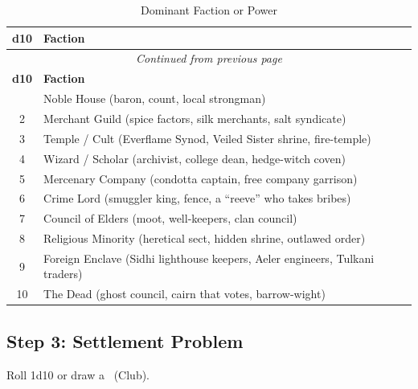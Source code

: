 \begin{center}
\begin{longtable}{cl}
\caption{Dominant Faction or Power}\\
\toprule
\textbf{d10} & \textbf{Faction} \\
\midrule
\endfirsthead
\multicolumn{2}{c}{\emph{Continued from previous page}} \\
\toprule
\textbf{d10} & \textbf{Faction} \\
\midrule
\endhead
\bottomrule
\endfoot
1 & Noble House (baron, count, local strongman) \\
2 & Merchant Guild (spice factors, silk merchants, salt syndicate) \\
3 & Temple / Cult (Everflame Synod, Veiled Sister shrine, fire-temple) \\
4 & Wizard / Scholar (archivist, college dean, hedge-witch coven) \\
5 & Mercenary Company (condotta captain, free company garrison) \\
6 & Crime Lord (smuggler king, fence, a ``reeve'' who takes bribes) \\
7 & Council of Elders (moot, well-keepers, clan council) \\
8 & Religious Minority (heretical sect, hidden shrine, outlawed order) \\
9 & Foreign Enclave (Sidhi lighthouse keepers, Aeler engineers, Tulkani traders) \\
10 & The Dead (ghost council, cairn that votes, barrow-wight) \\
\end{longtable}
\end{center}

\subsection{Step 3: Settlement Problem}
\label{sec:settlement-problem}
Roll 1d10 or draw a \clubsuit\ (Club).

